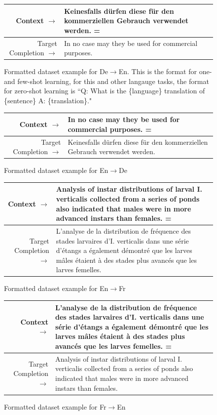 \documentclass{article}
\begin{document}
\begin{figure} { \tt \footnotesize \begin{tabularx}{\linewidth}{r X} \toprule Context $\to$ & Keinesfalls d\"urfen diese f\"ur den kommerziellen Gebrauch verwendet werden. = \\ 
 \midrule
Target Completion $\to$ & In no case may they be used for commercial purposes. \\
\bottomrule \end{tabularx} }  \caption{Formatted dataset example for De$\to$En.  This is the format for one- and few-shot learning, for this and other langauge tasks, the format for zero-shot learning is ``Q: What is the \{language\} translation of \{sentence\} A: \{translation\}." }  \label{eval:De_En}  \end{figure}
\begin{figure} { \tt \footnotesize \begin{tabularx}{\linewidth}{r X} \toprule Context $\to$ & In no case may they be used for commercial purposes. = \\ 
 \midrule Target Completion $\to$ & Keinesfalls d\"urfen diese f\"ur den kommerziellen Gebrauch verwendet werden. \\
\bottomrule \end{tabularx} }  \caption{Formatted dataset example for En$\to$De}  \label{eval:En_De}  \end{figure}
\begin{figure} { \tt \footnotesize \begin{tabularx}{\linewidth}{r X} \toprule Context $\to$ & Analysis of instar distributions of larval I. verticalis collected from a series of ponds also indicated that males were in more advanced instars than females. = \\ 
 \midrule Target Completion $\to$ & L'analyse de la distribution de fr\'equence des stades larvaires d'I. verticalis dans une s\'erie d'\'etangs a \'egalement d\'emontr\'e que les larves m\^ales \'etaient \`a des stades plus avanc\'es que les larves femelles. \\
\bottomrule \end{tabularx} }  \caption{Formatted dataset example for En$\to$Fr}  \label{eval:En_Fr}  \end{figure}
\begin{figure} { \tt \footnotesize \begin{tabularx}{\linewidth}{r X} \toprule Context $\to$ & L'analyse de la distribution de fr\'equence des stades larvaires d'I. verticalis dans une s\'erie d'\'etangs a \'egalement d\'emontr\'e que les larves m\^ales \'etaient \`a des stades plus avanc\'es que les larves femelles. = \\ 
 \midrule Target Completion $\to$ & Analysis of instar distributions of larval I. verticalis collected from a series of ponds also indicated that males were in more advanced instars than females. \\
\bottomrule \end{tabularx} }  \caption{Formatted dataset example for Fr$\to$En}  \label{eval:Fr_En}  \end{figure}
\end{document}
